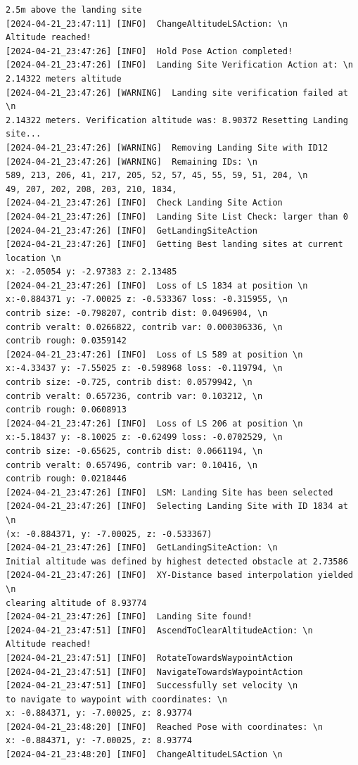 \begin{lstlisting}
2.5m above the landing site
[2024-04-21_23:47:11] [INFO]  ChangeAltitudeLSAction: \n 
Altitude reached!
[2024-04-21_23:47:26] [INFO]  Hold Pose Action completed!
[2024-04-21_23:47:26] [INFO]  Landing Site Verification Action at: \n 
2.14322 meters altitude
[2024-04-21_23:47:26] [WARNING]  Landing site verification failed at \n 
2.14322 meters. Verification altitude was: 8.90372 Resetting Landing site...
[2024-04-21_23:47:26] [WARNING]  Removing Landing Site with ID12
[2024-04-21_23:47:26] [WARNING]  Remaining IDs: \n 
589, 213, 206, 41, 217, 205, 52, 57, 45, 55, 59, 51, 204, \n 
49, 207, 202, 208, 203, 210, 1834, 
[2024-04-21_23:47:26] [INFO]  Check Landing Site Action
[2024-04-21_23:47:26] [INFO]  Landing Site List Check: larger than 0
[2024-04-21_23:47:26] [INFO]  GetLandingSiteAction
[2024-04-21_23:47:26] [INFO]  Getting Best landing sites at current location \n 
x: -2.05054 y: -2.97383 z: 2.13485
[2024-04-21_23:47:26] [INFO]  Loss of LS 1834 at position \n 
x:-0.884371 y: -7.00025 z: -0.533367 loss: -0.315955, \n 
contrib size: -0.798207, contrib dist: 0.0496904, \n 
contrib veralt: 0.0266822, contrib var: 0.000306336, \n 
contrib rough: 0.0359142
[2024-04-21_23:47:26] [INFO]  Loss of LS 589 at position \n 
x:-4.33437 y: -7.55025 z: -0.598968 loss: -0.119794, \n 
contrib size: -0.725, contrib dist: 0.0579942, \n 
contrib veralt: 0.657236, contrib var: 0.103212, \n 
contrib rough: 0.0608913
[2024-04-21_23:47:26] [INFO]  Loss of LS 206 at position \n 
x:-5.18437 y: -8.10025 z: -0.62499 loss: -0.0702529, \n 
contrib size: -0.65625, contrib dist: 0.0661194, \n 
contrib veralt: 0.657496, contrib var: 0.10416, \n 
contrib rough: 0.0218446
[2024-04-21_23:47:26] [INFO]  LSM: Landing Site has been selected
[2024-04-21_23:47:26] [INFO]  Selecting Landing Site with ID 1834 at \n 
(x: -0.884371, y: -7.00025, z: -0.533367)
[2024-04-21_23:47:26] [INFO]  GetLandingSiteAction: \n 
Initial altitude was defined by highest detected obstacle at 2.73586
[2024-04-21_23:47:26] [INFO]  XY-Distance based interpolation yielded \n 
clearing altitude of 8.93774
[2024-04-21_23:47:26] [INFO]  Landing Site found!
[2024-04-21_23:47:51] [INFO]  AscendToClearAltitudeAction: \n 
Altitude reached!
[2024-04-21_23:47:51] [INFO]  RotateTowardsWaypointAction
[2024-04-21_23:47:51] [INFO]  NavigateTowardsWaypointAction
[2024-04-21_23:47:51] [INFO]  Successfully set velocity \n 
to navigate to waypoint with coordinates: \n 
x: -0.884371, y: -7.00025, z: 8.93774
[2024-04-21_23:48:20] [INFO]  Reached Pose with coordinates: \n 
x: -0.884371, y: -7.00025, z: 8.93774
[2024-04-21_23:48:20] [INFO]  ChangeAltitudeLSAction \n 

\end{lstlisting}
